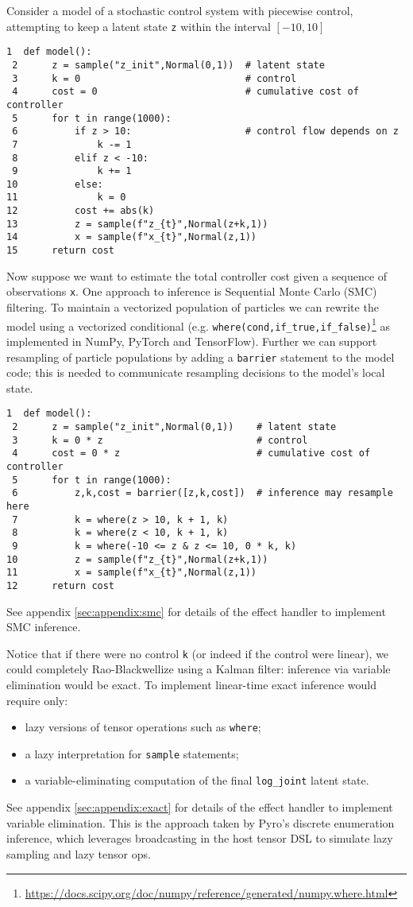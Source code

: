 \documentclass[anonymous=false, %
               format=acmsmall, %
               review=true, %
               screen=true, %
               nonacm=true]{acmart}
\begin{document}
Consider a model of a stochastic control system with piecewise control, attempting to keep a latent state \verb$z$ within the interval $[-10,10]$
\begin{Verbatim}[samepage=true]
 1  def model():
 2      z = sample("z_init",Normal(0,1))  # latent state
 3      k = 0                             # control
 4      cost = 0                          # cumulative cost of controller
 5      for t in range(1000):
 6          if z > 10:                    # control flow depends on z
 7              k -= 1
 8          elif z < -10:
 9              k += 1
10          else:
11              k = 0
12          cost += abs(k)
13          z = sample(f"z_{t}",Normal(z+k,1))
14          x = sample(f"x_{t}",Normal(z,1))
15      return cost
\end{Verbatim}
Now suppose we want to estimate the total controller cost given a sequence of observations \verb$x$.
One approach to inference is Sequential Monte Carlo (SMC) filtering.
To maintain a vectorized population of particles we can rewrite the model using a vectorized conditional (e.g. \verb$where(cond,if_true,if_false)$\footnote{\url{https://docs.scipy.org/doc/numpy/reference/generated/numpy.where.html}} as implemented in NumPy, PyTorch and TensorFlow).
Further we can support resampling of particle populations by adding a \verb$barrier$ statement to the model code; this is needed to communicate resampling decisions to the model's local state.
\begin{Verbatim}[samepage=true]
 1  def model():
 2      z = sample("z_init",Normal(0,1))    # latent state
 3      k = 0 * z                           # control
 4      cost = 0 * z                        # cumulative cost of controller
 5      for t in range(1000):
 6          z,k,cost = barrier([z,k,cost])  # inference may resample here
 7          k = where(z > 10, k + 1, k)
 8          k = where(z < 10, k + 1, k)
 9          k = where(-10 <= z & z <= 10, 0 * k, k)
10          z = sample(f"z_{t}",Normal(z+k,1))
11          x = sample(f"x_{t}",Normal(z,1))
12      return cost
\end{Verbatim}
See appendix \ref{sec:appendix:smc} for details of the effect handler to implement SMC inference.

Notice that if there were no control \verb$k$ (or indeed if the control were linear), we could completely Rao-Blackwellize using a Kalman filter: inference via variable elimination would be exact.
To implement linear-time exact inference would require only:
\begin{itemize}
  \item lazy versions of tensor operations such as \verb$where$;
  \item a lazy interpretation for \verb$sample$ statements;
  \item a variable-eliminating computation of the final \verb$log_joint$ latent state.
\end{itemize}
See appendix \ref{sec:appendix:exact} for details of the effect handler to implement variable elimination.
This is the approach taken by Pyro's discrete enumeration inference, which leverages broadcasting in the host tensor DSL to simulate lazy sampling and lazy tensor ops.
\end{document}
